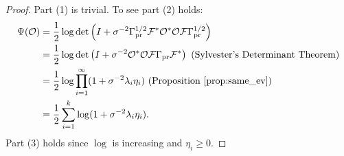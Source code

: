 \documentclass[ba]{imsart}
\newcommand{\obs}{\mathcal{O}}
\newcommand{\fwd}{\mathcal{F}}
\newcommand{\tar}{\Psi}
\theoremstyle{plain}
\theoremstyle{definition}
\theoremstyle{remark}
\providecommand{\DIFaddbegin}{} %
\providecommand{\DIFaddend}{} %
\providecommand{\DIFdelbegin}{} %
\providecommand{\DIFdelend}{} %
\newcommand{\DIFscaledelfig}{0.5}
\newlength{\DIFdelgraphicswidth} %
\newlength{\DIFdelgraphicsheight} %
\newcommand{\DIFaddincludegraphics}[2][]{{\color{blue}\fbox{\DIFOincludegraphics[#1]{#2}}}} %
\newcommand{\DIFdelincludegraphics}[2][]{%
\sbox{\DIFdelgraphicsbox}{\DIFOincludegraphics[#1]{#2}}%
\settoboxwidth{\DIFdelgraphicswidth}{\DIFdelgraphicsbox} %
\settoboxtotalheight{\DIFdelgraphicsheight}{\DIFdelgraphicsbox} %
\scalebox{\DIFscaledelfig}{%
\parbox[b]{\DIFdelgraphicswidth}{\usebox{\DIFdelgraphicsbox}\\[-\baselineskip] \rule{\DIFdelgraphicswidth}{0em}}\llap{\resizebox{\DIFdelgraphicswidth}{\DIFdelgraphicsheight}{%
\setlength{\unitlength}{\DIFdelgraphicswidth}%
\begin{picture}(1,1)%
\thicklines\linethickness{2pt} %
{\color[rgb]{1,0,0}\put(0,0){\framebox(1,1){}}}%
{\color[rgb]{1,0,0}\put(0,0){\line( 1,1){1}}}%
{\color[rgb]{1,0,0}\put(0,1){\line(1,-1){1}}}%
\end{picture}%
}\hspace*{3pt}}} %
} %
\DeclareRobustCommand{\DIFaddbegin}{\DIFOaddbegin \let\includegraphics\DIFaddincludegraphics} %
\DeclareRobustCommand{\DIFaddend}{\DIFOaddend \let\includegraphics\DIFOincludegraphics} %
\DeclareRobustCommand{\DIFdelbegin}{\DIFOdelbegin \let\includegraphics\DIFdelincludegraphics} %
\DeclareRobustCommand{\DIFdelend}{\DIFOaddend \let\includegraphics\DIFOincludegraphics} %
\begin{document}
\begin{proof}
  Part (1) is trivial. To see part (2) holds: 
  \DIFdelbegin %
\DIFdelend \DIFaddbegin \begin{align}
    \begin{split}
      \tar(\obs) &= \frac{1}{2}\log \det \left (I + \sigma^{-2} \prcov^{1/2} \fwd ^* \obs^*
      \obs \fwd \prcov^{1/2}\right )\\&= \frac{1}{2} \log \det \left (I + \sigma^{-2} \obs^* \obs \fwd
      \prcov\fwd^* \right ) \text{ (Sylvester's Determinant
      Theorem)}\\
&=\frac{1}{2} \log \prod_{i=1}^{\infty} ( 1 + \sigma^{-2} \lambda_i\eta_i ) \text{ (Proposition \ref{prop:same_ev})} \\
&=\frac{1}{2} \sum_{i=1}^{k} \log (1 + \sigma^{-2}\lambda_i\eta_i). 
\end{split}
  \end{align}\DIFaddend 
  Part (3) holds since $\log$ is increasing and $\eta_i \geq 0$.
\end{proof}
\end{document}
